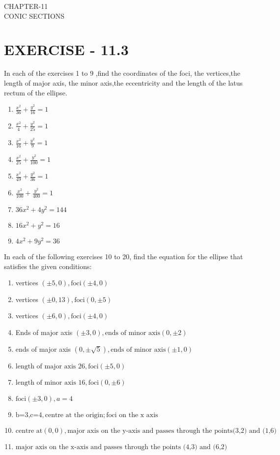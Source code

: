 \documentclass[12pt]{article}
\begin{document}
\begin{center}
\textbf\large{CHAPTER-11 \\ CONIC SECTIONS}
\end{center}

\setcounter{page}{1}

\section{EXERCISE - 11.3}

In each of the exercises 1 to 9 ,find the coordinates of the foci, the vertices,the length of major axis, the minor axis,the eccentricity and the length of the latus rectum of the ellipse.

\begin{enumerate} 
  \item $\frac{x^2}{36}+\frac{y^2}{16}=1$
  \item $\frac{x^2}{4}+\frac{y^2}{25}=1$
  \item $\frac{x^2}{16}+\frac{y^2}{9}=1$
  \item $\frac{x^2}{25}+\frac{y^2}{100}=1$
  \item $\frac{x^2}{49}+\frac{y^2}{36}=1$
  \item $\frac{x^2}{100}+\frac{y^2}{400}=1$
  \item $36x^2+4y^2=144$
  \item $16x^2+y^2=16$
  \item $4x^2+9y^2=36$
\end{enumerate}

In each of the following exercises 10 to 20, find the equation for the ellipse that satisfies the given conditions:

\begin{enumerate}[resume]
\item vertices $(\pm5,0),\text{foci} (\pm4,0)$
\item vertices $(\pm0,13),\text{foci} (0,\pm5)$
\item vertices $(\pm6,0),\text{foci} (\pm4,0)$
\item Ends of major axis $(\pm3,0),\text{ends of minor axis}(0,\pm2)$
\item  ends of major axis $(0,\pm \sqrt{5}),\text{ends of minor axis} (\pm1,0)$
\item $\text {length of major axis 26},\text{foci} (\pm5,0)$
\item $\text {length of minor axis 16},\text{foci} (0,\pm6)$
\item $\text {foci} (\pm3,0),a=4$
\item $\text {b=3,c=4},\text {centre at the origin} ;\text{foci on the x axis}$
\item $\text {centre at} (0,0),\text{major axis on the y-axis and passes through the points} \text {(3,2) and (1,6)}$
\item $\text{major axis on the x-axis and passes through the points (4,3) and (6,2)}$
\end{enumerate}
\end{document}
